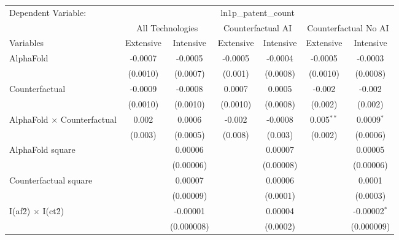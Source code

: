 \begingroup
\centering
\begin{tabular}{lcccccc}
   \tabularnewline \midrule \midrule
   Dependent Variable: & \multicolumn{6}{c}{ln1p\_patent\_count}\\
 & \multicolumn{2}{c}{All Technologies} & \multicolumn{2}{c}{Counterfactual AI} & \multicolumn{2}{c}{Counterfactual No AI} \\
\cmidrule(lr){1-1}\cmidrule(lr){2-3} \cmidrule(lr){4-5} \cmidrule(lr){6-7}
Variables & \multicolumn{1}{c}{Extensive} & \multicolumn{1}{c}{Intensive} & \multicolumn{1}{c}{Extensive} & \multicolumn{1}{c}{Intensive} & \multicolumn{1}{c}{Extensive} & \multicolumn{1}{c}{Intensive} \\
\cmidrule(lr){1-1}\cmidrule(lr){2-2} \cmidrule(lr){3-3} \cmidrule(lr){4-4} \cmidrule(lr){5-5} \cmidrule(lr){6-6} \cmidrule(lr){7-7}
   AlphaFold                          & -0.0007  & -0.0005    & -0.0005  & -0.0004   & -0.0005      & -0.0003\\   
                                      & (0.0010) & (0.0007)   & (0.001)  & (0.0008)  & (0.0010)     & (0.0008)\\   
   Counterfactual                     & -0.0009  & -0.0008    & 0.0007   & 0.0005    & -0.002       & -0.002\\   
                                      & (0.0010) & (0.0010)   & (0.0010) & (0.0008)  & (0.002)      & (0.002)\\   
   AlphaFold $\times$ Counterfactual  & 0.002    & 0.0006     & -0.002   & -0.0008   & 0.005$^{**}$ & 0.0009$^{*}$\\   
                                      & (0.003)  & (0.0005)   & (0.008)  & (0.003)   & (0.002)      & (0.0006)\\   
   AlphaFold square                   &          & 0.00006    &          & 0.00007   &              & 0.00005\\   
                                      &          & (0.00006)  &          & (0.00008) &              & (0.00006)\\   
   Counterfactual square              &          & 0.00007    &          & 0.00006   &              & 0.0001\\   
                                      &          & (0.00009)  &          & (0.0001)  &              & (0.0003)\\   
   I(af\^2) $\times$ I(ct\^2)         &          & -0.00001   &          & 0.00004   &              & -0.00002$^{*}$\\   
                                      &          & (0.000008) &          & (0.0002)  &              & (0.000009)\\   

\end{tabular}
